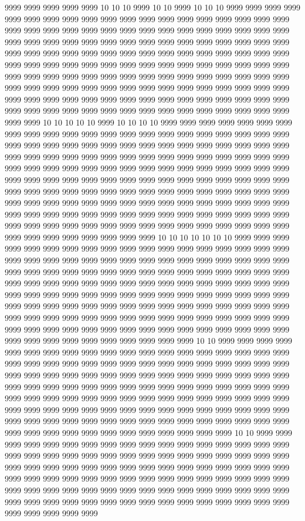 9999 9999 9999 9999 9999 10 10 10 9999 10 10 9999 10 10 10 9999 9999 9999 9999 9999 9999 9999 9999 9999 9999 9999 9999 9999 9999 9999 9999 9999 9999 9999 9999 9999 9999 9999 9999 9999 9999 9999 9999 9999 9999 9999 9999 9999 9999 9999 9999 9999 9999 9999 9999 9999 9999 9999 9999 9999 9999 9999 9999 9999 9999 9999 9999 9999 9999 9999 9999 9999 9999 9999 9999 9999 9999 9999 9999 9999 9999 9999 9999 9999 9999 9999 9999 9999 9999 9999 9999 9999 9999 9999 9999 9999 9999 9999 9999 9999 9999 9999 9999 9999 9999 9999 9999 9999 9999 9999 9999 9999 9999 9999 9999 9999 9999 9999 9999 9999 9999 9999 9999 9999 9999 9999 9999 9999 9999 9999 9999 9999 9999 9999 9999 9999 9999 9999 9999 9999 9999 9999 9999 9999 9999 9999 9999 9999 9999 9999 9999 9999 9999 9999 9999 9999 10 10 10 10 10 9999 10 10 10 10 9999 9999 9999 9999 9999 9999 9999 9999 9999 9999 9999 9999 9999 9999 9999 9999 9999 9999 9999 9999 9999 9999 9999 9999 9999 9999 9999 9999 9999 9999 9999 9999 9999 9999 9999 9999 9999 9999 9999 9999 9999 9999 9999 9999 9999 9999 9999 9999 9999 9999 9999 9999 9999 9999 9999 9999 9999 9999 9999 9999 9999 9999 9999 9999 9999 9999 9999 9999 9999 9999 9999 9999 9999 9999 9999 9999 9999 9999 9999 9999 9999 9999 9999 9999 9999 9999 9999 9999 9999 9999 9999 9999 9999 9999 9999 9999 9999 9999 9999 9999 9999 9999 9999 9999 9999 9999 9999 9999 9999 9999 9999 9999 9999 9999 9999 9999 9999 9999 9999 9999 9999 9999 9999 9999 9999 9999 9999 9999 9999 9999 9999 9999 9999 9999 9999 9999 9999 9999 9999 9999 9999 9999 9999 9999 9999 9999 9999 9999 9999 9999 10 10 10 10 10 10 10 9999 9999 9999 9999 9999 9999 9999 9999 9999 9999 9999 9999 9999 9999 9999 9999 9999 9999 9999 9999 9999 9999 9999 9999 9999 9999 9999 9999 9999 9999 9999 9999 9999 9999 9999 9999 9999 9999 9999 9999 9999 9999 9999 9999 9999 9999 9999 9999 9999 9999 9999 9999 9999 9999 9999 9999 9999 9999 9999 9999 9999 9999 9999 9999 9999 9999 9999 9999 9999 9999 9999 9999 9999 9999 9999 9999 9999 9999 9999 9999 9999 9999 9999 9999 9999 9999 9999 9999 9999 9999 9999 9999 9999 9999 9999 9999 9999 9999 9999 9999 9999 9999 9999 9999 9999 9999 9999 9999 9999 9999 9999 9999 9999 9999 9999 9999 9999 9999 9999 9999 9999 9999 9999 9999 9999 9999 9999 9999 9999 9999 9999 9999 9999 10 10 9999 9999 9999 9999 9999 9999 9999 9999 9999 9999 9999 9999 9999 9999 9999 9999 9999 9999 9999 9999 9999 9999 9999 9999 9999 9999 9999 9999 9999 9999 9999 9999 9999 9999 9999 9999 9999 9999 9999 9999 9999 9999 9999 9999 9999 9999 9999 9999 9999 9999 9999 9999 9999 9999 9999 9999 9999 9999 9999 9999 9999 9999 9999 9999 9999 9999 9999 9999 9999 9999 9999 9999 9999 9999 9999 9999 9999 9999 9999 9999 9999 9999 9999 9999 9999 9999 9999 9999 9999 9999 9999 9999 9999 9999 9999 9999 9999 9999 9999 9999 9999 9999 9999 9999 9999 9999 9999 9999 9999 9999 9999 9999 9999 9999 9999 9999 9999 9999 9999 9999 9999 10 10 9999 9999 9999 9999 9999 9999 9999 9999 9999 9999 9999 9999 9999 9999 9999 9999 9999 9999 9999 9999 9999 9999 9999 9999 9999 9999 9999 9999 9999 9999 9999 9999 9999 9999 9999 9999 9999 9999 9999 9999 9999 9999 9999 9999 9999 9999 9999 9999 9999 9999 9999 9999 9999 9999 9999 9999 9999 9999 9999 9999 9999 9999 9999 9999 9999 9999 9999 9999 9999 9999 9999 9999 9999 9999 9999 9999 9999 9999 9999 9999 9999 9999 9999 9999 9999 9999 9999 9999 9999 9999 9999 9999 9999 9999 9999 9999 9999 